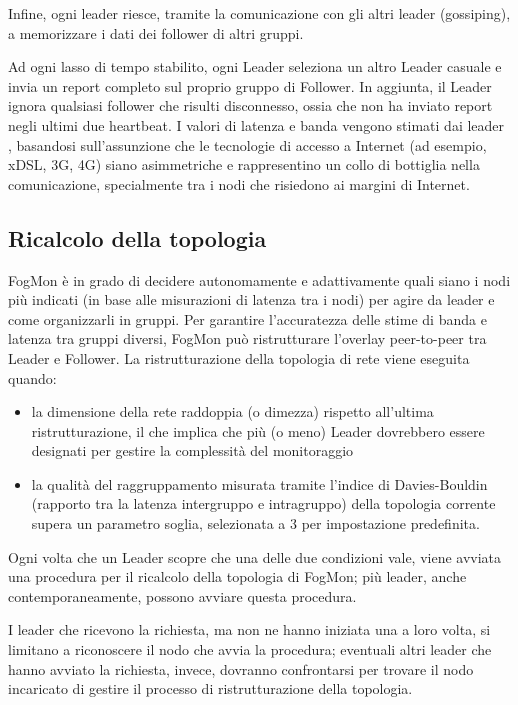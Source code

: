         Infine, ogni leader riesce, tramite la comunicazione con gli altri leader (gossiping), a memorizzare i dati dei follower di altri gruppi.
        
        
        Ad ogni lasso di tempo stabilito, ogni Leader seleziona un altro Leader casuale e invia un report completo sul proprio gruppo di Follower. In aggiunta, il Leader ignora qualsiasi follower che risulti disconnesso, ossia che non ha inviato report negli ultimi due heartbeat. I valori di latenza e banda vengono stimati dai leader \cite{FogMon}, basandosi sull'assunzione che le tecnologie di accesso a Internet (ad esempio, xDSL, 3G, 4G) siano asimmetriche e rappresentino un collo di bottiglia nella comunicazione, specialmente tra i nodi che risiedono ai margini di Internet.
        \subsection{Ricalcolo della topologia}
        FogMon è in grado di decidere autonomamente e adattivamente quali siano i nodi più indicati (in base alle misurazioni di latenza tra i nodi) per agire da leader e come organizzarli in gruppi. Per garantire l'accuratezza delle stime di banda e latenza tra gruppi diversi, FogMon può ristrutturare l'overlay peer-to-peer tra Leader e Follower.
            La ristrutturazione della topologia di rete viene eseguita quando:
            \begin{itemize}
                \item la dimensione della rete raddoppia (o dimezza) rispetto all'ultima ristrutturazione, il che implica che più (o meno) Leader dovrebbero essere designati per gestire la complessità del monitoraggio
                
                \item la qualità del raggruppamento misurata tramite l'indice di Davies-Bouldin \cite{davies-bouldin} (rapporto tra la latenza intergruppo e intragruppo) della topologia corrente supera un parametro soglia, selezionata a 3 per impostazione predefinita.
            \end{itemize}
        Ogni volta che un Leader scopre che una delle due condizioni vale, viene avviata una procedura per il ricalcolo della topologia di FogMon; più leader, anche  contemporaneamente, possono avviare questa procedura.
        
        I leader che ricevono la richiesta, ma non ne hanno iniziata una a loro volta, si limitano a riconoscere il nodo che avvia la procedura; eventuali altri leader che hanno avviato la richiesta, invece, dovranno confrontarsi per trovare il nodo incaricato di gestire il processo di ristrutturazione della topologia.
        
